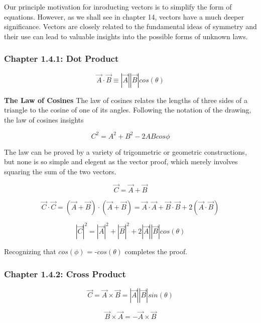 \documentclass[11pt]{article}
\begin{document}
Our principle motivation for inroducting vectors is to simplify the form of equations.
However, as we shall see in chapter 14, vectors have a much deeper significance. Vectors are closely related to the
fundamental ideas of symmetry and their use can lead to valuable insights into the possible forms of unknown laws. 

\begin{center}
    \item \subsubsection*{Chapter 1.4.1: Dot Product} 
\end{center}

\[
    \vec{A} \cdot \vec{B} \equiv |\vec{A}||\vec{B}|cos(\theta)
\]

\textbf{The Law of Cosines}
The law of cosines relates the lengths of three sides of a triangle to the cosine of one of its angles.
Following the notation of the drawing, the law of cosines insights

\[
    C^{2} = A^{2} + B^{2} - 2ABcos{\phi}
\]

The law can be proved by a variety of trigonmetric or geometric constructions, but none is so simple and elegent
as the vector proof, which merely involves squaring the sum of the two vectors.

\[
    \vec{C} = \vec{A} + \vec{B}
\]

\[
    \vec{C} \cdot \vec{C} = (\vec{A} + \vec{B}) \cdot (\vec{A} + \vec{B}) = \vec{A} \cdot \vec{A} + \vec{B} \cdot \vec{B} + 2(\vec{A} \cdot \vec{B}) 
\]

\[
    |\vec{C}|^{2} = |\vec{A}|^{2} + |\vec{B}|^{2} + 2|\vec{A}||\vec{B}|cos(\theta)
\]

Recognizing that $cos(\phi)$ = -$cos(\theta)$ completes the proof.

\newpage

\begin{center}
    \item \subsubsection*{Chapter 1.4.2: Cross Product} 
\end{center}

\[
    \vec{C} = \vec{A} \times \vec{B} = |\vec{A}||\vec{B}|sin(\theta)
\]

\[
    \vec{B} \times \vec{A} = -\vec{A} \times \vec{B}
\]
\end{document}
